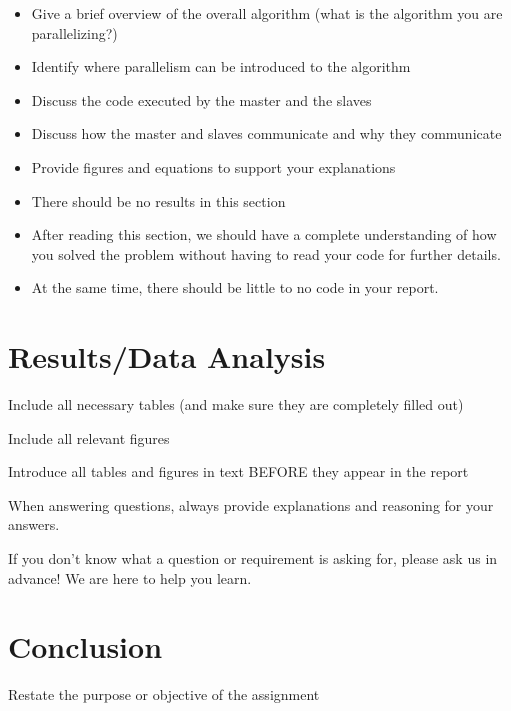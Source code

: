 \documentclass{article}
\begin{document}
\newpage




	
\begin{itemize}

\item	Give a brief overview of the overall algorithm (what is the algorithm you are parallelizing?)
	
\item	Identify where parallelism can be introduced to the algorithm
	
\item	Discuss the code executed by the master and the slaves
	
\item	Discuss how the master and slaves communicate and why they communicate
	
\item	Provide figures and equations to support your explanations
	
\item	There should be no results in this section
	
\item	After reading this section, we should have a complete understanding of how you solved the problem without having to read your code for further details.
	
\item	At the same time, there should be little to no code in your report.
\end{itemize}	
	\section{Results/Data Analysis}
	Include all necessary tables (and make sure they are completely filled out)
	
	Include all relevant figures
	
	Introduce all tables and figures in text BEFORE they appear in the report
	
	When answering questions, always provide explanations and reasoning for your answers.
	
	If you don't know what a question or requirement is asking for, please ask us in advance! We are here to help you learn.
	
	
	\section{Conclusion}
	Restate the purpose or objective of the assignment
	
\end{document}
